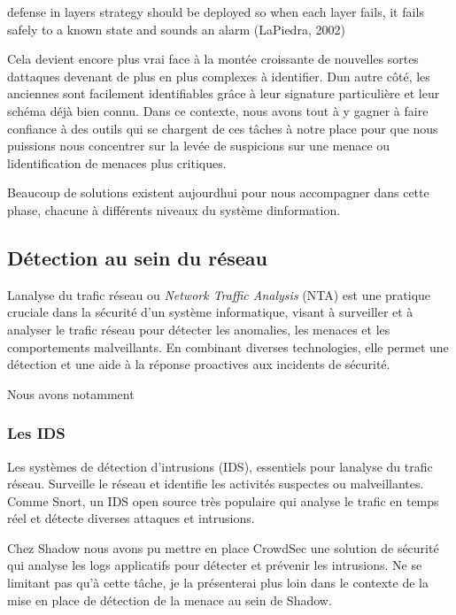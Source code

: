 \documentclass[
  11pt,
  a4paper,
  krantz2,
  11pt,
  oneside]{krantz}
\renewenvironment{quote}{\begin{VF}}{\end{VF}}
\begin{document}
\begin{quote}
defense in layers strategy should be deployed so when each layer fails, it fails safely to a known state and sounds an alarm (LaPiedra, 2002)
\end{quote}

Cela devient encore plus vrai face à la montée croissante de nouvelles sortes d\textquotesingle attaques devenant de plus en plus complexes à identifier. D\textquotesingle un autre côté, les anciennes sont facilement identifiables grâce à leur signature particulière et leur schéma déjà bien connu. Dans ce contexte, nous avons tout à y gagner à faire confiance à des outils qui se chargent de ces tâches à notre place pour que nous puissions nous concentrer sur la levée de suspicions sur une menace ou l\textquotesingle identification de menaces plus critiques.

Beaucoup de solutions existent aujourd\textquotesingle hui pour nous accompagner dans cette phase, chacune à différents niveaux du système d\textquotesingle information.

\subsection{Détection au sein du réseau}\label{duxe9tection-au-sein-du-ruxe9seau}

L\textquotesingle analyse du trafic réseau ou \emph{Network Traffic Analysis} (NTA) est une pratique cruciale dans la sécurité d'un système informatique, visant à surveiller et à analyser le trafic réseau pour détecter les anomalies, les menaces et les comportements malveillants. En combinant diverses technologies, elle permet une détection et une aide à la réponse proactives aux incidents de sécurité.

Nous avons notamment

\subsubsection{Les IDS}\label{les-ids}

Les systèmes de détection d'intrusions (IDS), essentiels pour l\textquotesingle analyse du trafic réseau. Surveille le réseau et identifie les activités suspectes ou malveillantes. Comme Snort, un IDS open source très populaire qui analyse le trafic en temps réel et détecte diverses attaques et intrusions.

Chez Shadow nous avons pu mettre en place CrowdSec une solution de sécurité qui analyse les logs applicatifs pour détecter et prévenir les intrusions. Ne se limitant pas qu'à cette tâche, je la présenterai plus loin dans le contexte de la mise en place de détection de la menace au sein de Shadow.
\end{document}

